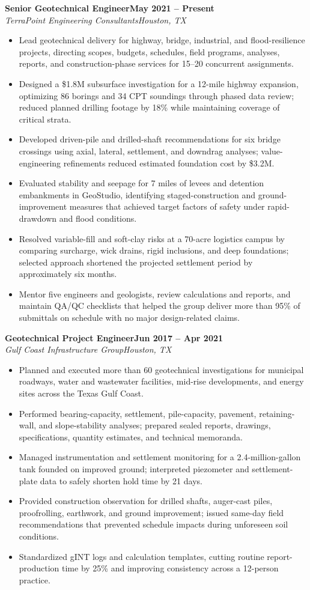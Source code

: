 \documentclass[10pt,letterpaper]{article}
\newcommand{\resumeRole}[4]{%
  \textbf{#1}\hfill\textbf{#2}\\[-0.15em]
  \textit{#3}\hfill\textit{#4}\vspace{-0.25em}
}
\begin{document}
\resumeRole{Senior Geotechnical Engineer}{May 2021 -- Present}{TerraPoint Engineering Consultants}{Houston, TX}
\begin{itemize}
  \item Lead geotechnical delivery for highway, bridge, industrial, and flood-resilience projects, directing scopes, budgets, schedules, field programs, analyses, reports, and construction-phase services for 15--20 concurrent assignments.
  \item Designed a \$1.8M subsurface investigation for a 12-mile highway expansion, optimizing 86 borings and 34 CPT soundings through phased data review; reduced planned drilling footage by 18\% while maintaining coverage of critical strata.
  \item Developed driven-pile and drilled-shaft recommendations for six bridge crossings using axial, lateral, settlement, and downdrag analyses; value-engineering refinements reduced estimated foundation cost by \$3.2M.
  \item Evaluated stability and seepage for 7 miles of levees and detention embankments in GeoStudio, identifying staged-construction and ground-improvement measures that achieved target factors of safety under rapid-drawdown and flood conditions.
  \item Resolved variable-fill and soft-clay risks at a 70-acre logistics campus by comparing surcharge, wick drains, rigid inclusions, and deep foundations; selected approach shortened the projected settlement period by approximately six months.
  \item Mentor five engineers and geologists, review calculations and reports, and maintain QA/QC checklists that helped the group deliver more than 95\% of submittals on schedule with no major design-related claims.
\end{itemize}

\resumeRole{Geotechnical Project Engineer}{Jun 2017 -- Apr 2021}{Gulf Coast Infrastructure Group}{Houston, TX}
\begin{itemize}
  \item Planned and executed more than 60 geotechnical investigations for municipal roadways, water and wastewater facilities, mid-rise developments, and energy sites across the Texas Gulf Coast.
  \item Performed bearing-capacity, settlement, pile-capacity, pavement, retaining-wall, and slope-stability analyses; prepared sealed reports, drawings, specifications, quantity estimates, and technical memoranda.
  \item Managed instrumentation and settlement monitoring for a 2.4-million-gallon tank founded on improved ground; interpreted piezometer and settlement-plate data to safely shorten hold time by 21 days.
  \item Provided construction observation for drilled shafts, auger-cast piles, proofrolling, earthwork, and ground improvement; issued same-day field recommendations that prevented schedule impacts during unforeseen soil conditions.
  \item Standardized gINT logs and calculation templates, cutting routine report-production time by 25\% and improving consistency across a 12-person practice.
\end{itemize}
\end{document}
